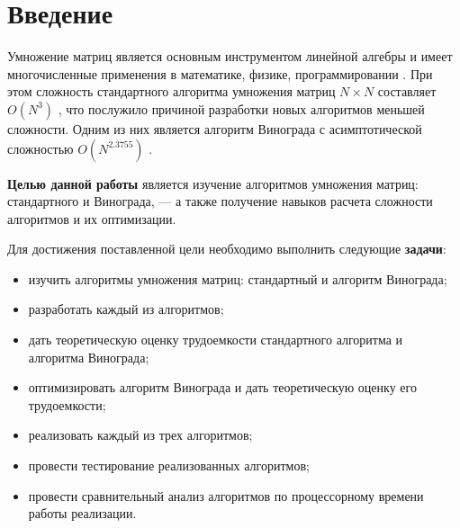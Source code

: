 \chapter*{Введение}

Умножение матриц является основным инструментом линейной алгебры и имеет
многочисленные применения в математике, физике, программировании
\cite{haskell}. При этом сложность стандартного алгоритма умножения матриц
$N \times N$ составляет $O(N^3)$ \cite{till}, что послужило причиной разработки
новых алгоритмов меньшей сложности. Одним из них является алгоритм Винограда с
асимптотической сложностью $O(N^{2.3755})$ \cite{haskell}.

\textbf{Целью данной работы} является изучение алгоритмов умножения матриц:
стандартного и Винограда, --- а также получение навыков расчета сложности
алгоритмов и их оптимизации.

Для достижения поставленной цели необходимо выполнить следующие
\textbf{задачи}:
\begin{itemize}[left=\parindent]
    \item изучить алгоритмы умножения матриц: стандартный и алгоритм Винограда;
    \item разработать каждый из алгоритмов;
    \item дать теоретическую оценку трудоемкости стандартного алгоритма и
          алгоритма Винограда;
    \item оптимизировать алгоритм Винограда и дать теоретическую оценку
          его трудоемкости;
    \item реализовать каждый из трех алгоритмов;
    \item провести тестирование реализованных алгоритмов;
    \item провести сравнительный анализ алгоритмов по процессорному времени
          работы реализации.
\end{itemize}
